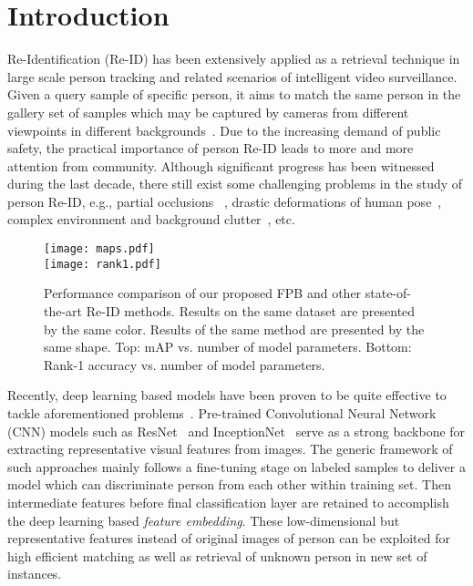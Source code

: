 \documentclass[journal]{IEEEtran}
\begin{document}
\IEEEpeerreviewmaketitle


\section{Introduction}\label{sec:introduction}
 Re-Identification (Re-ID) has been extensively applied as a retrieval technique in large scale person tracking and related scenarios of intelligent video surveillance.
Given a query sample of specific person, it aims to match the same person in the gallery set of samples which may be captured by cameras from different viewpoints in different backgrounds~\cite{zheng2016person,9336268}.
Due to the increasing demand of public safety, the practical importance of person Re-ID leads to more and more attention from community.
Although significant progress has been witnessed during the last decade, there still exist some challenging problems in the study of person Re-ID, e.g., partial occlusions ~\cite{8578633,8954276}, drastic deformations of human pose~\cite{8099586,8578149}, complex environment and background clutter~\cite{8578227}, etc.
\begin{figure}
\centering
  \texttt{[image: maps.pdf]} \\
  \texttt{[image: rank1.pdf]}
\caption{Performance comparison of our proposed FPB and other state-of-the-art Re-ID methods. 
  Results on the same dataset are presented by the same color.
  Results of the same method are presented by the same shape.
  Top: mAP vs. number of model parameters.
  Bottom: Rank-1 accuracy vs. number of model parameters.
  }
  \label{fig:maps}
\end{figure}

Recently, deep learning based models have been proven to be quite effective to tackle aforementioned problems~\cite{zheng2016person,sun2018beyond,luo2019bag}.
Pre-trained Convolutional Neural Network (CNN) models such as ResNet~\cite{he2016deep} and InceptionNet~\cite{szegedy2017inception} serve as a strong backbone for extracting representative visual features from images.
The generic framework of such approaches mainly follows a fine-tuning stage on labeled samples to deliver a model which can discriminate person from each other within training set.
Then intermediate features before final classification layer are retained to accomplish the deep learning based \textit{feature embedding}.
These low-dimensional but representative features instead of original images of person can be exploited for high efficient matching as well as retrieval of unknown person in new set of instances.
\end{document}
